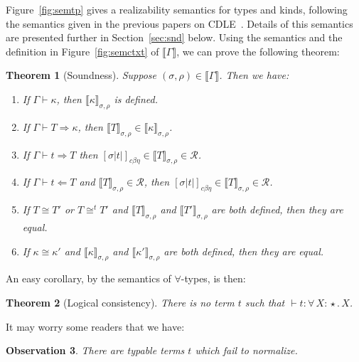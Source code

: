\documentclass{article}
\newcommand{\abs}[4]{{#1}\, #2\! : \! #3.\, #4}
\newcommand{\interp}[1]{\llbracket #1 \rrbracket}
\newcommand{\tpcheck}[0]{\Leftarrow}
\newcommand{\tpsynth}[0]{\Rightarrow}
\newcommand{\cbe}[0]{c\beta\eta}
\newtheorem{theorem}{Theorem}
\newtheorem{observation}[theorem]{Observation}
\begin{document}
Figure~\ref{fig:semtp} gives a realizability semantics for types and
kinds, following the semantics given in the previous papers on
CDLE~\cite{stump18,stump17}.  Details of this semantics are presented
further in Section~\ref{sec:snd} below.  Using the semantics and the
definition in Figure~\ref{fig:semctxt} of $\interp{\Gamma}$, we can
prove the following theorem:
\begin{theorem}[Soundness]
\label{thm:snd}
Suppose $(\sigma,\rho)\in\interp{\Gamma}$.  Then we have:
\begin{enumerate}
\item If $\Gamma\vdash \kappa$, then $\interp{\kappa}_{\sigma,\rho}$ is defined.
\item If $\Gamma\vdash T \tpsynth \kappa$, then $\interp{T}_{\sigma,\rho}\in\interp{\kappa}_{\sigma,\rho}$.
\item If $\Gamma\vdash t \tpsynth T$ then $[\sigma |t|]_{\cbe}\in\interp{T}_{\sigma,\rho}\in \mathcal{R}$.
\item If $\Gamma\vdash t \tpcheck T$ and $\interp{T}_{\sigma,\rho}\in \mathcal{R}$, then
    $[\sigma |t|]_{\cbe}\in\interp{T}_{\sigma,\rho}\in \mathcal{R}$.
\item If $T \cong T'$ or $T \cong^t T'$ and $\interp{T}_{\sigma,\rho}$ and $\interp{T'}_{\sigma,\rho}$ are both defined, then they are equal.
\item If \(\kappa \cong \kappa'\) and \(\interp{\kappa}_{\sigma,\rho}\) and
  \(\interp{\kappa'}_{\sigma,\rho}\) are both defined, then they are equal.
\end{enumerate}
\end{theorem}

An easy corollary, by the semantics of $\forall$-types, is then:

\begin{theorem}[Logical consistency]
\label{thm:consis}
  There is no term $t$ such that $\vdash t : \abs{\forall}{X}{\star}{X}$.
\end{theorem}

It may worry some readers that we have:
\begin{observation}
  There are typable terms $t$ which fail to normalize.
\end{observation}
\end{document}
